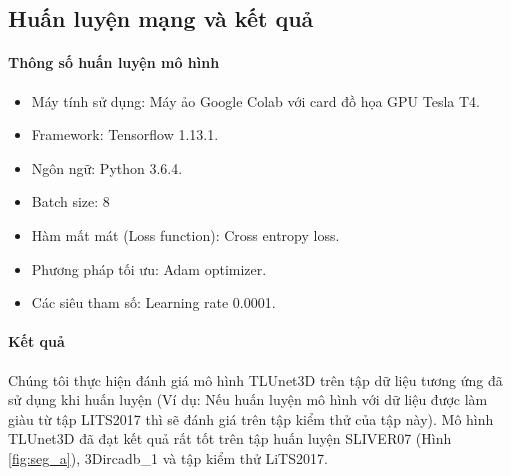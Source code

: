 \subsection{Huấn luyện mạng và kết quả}
\paragraph{Thông số huấn luyện mô hình}
\begin{itemize}
\item Máy tính sử dụng: Máy ảo Google Colab với card đồ họa GPU Tesla T4.
\item Framework: Tensorflow 1.13.1.
\item Ngôn ngữ: Python 3.6.4.
\item Batch size: 8
\item Hàm mất mát (Loss function): Cross entropy loss.
\item Phương pháp tối ưu: Adam optimizer.
\item Các siêu tham số: Learning rate 0.0001.
\end{itemize}
\paragraph{Kết quả}
Chúng tôi thực hiện đánh giá mô hình TLUnet3D trên tập dữ liệu tương ứng đã sử dụng khi huấn luyện (Ví dụ: Nếu huấn luyện mô hình với dữ liệu được làm giàu từ tập LITS2017 thì sẽ đánh giá trên tập kiểm thử của tập này). Mô hình TLUnet3D đã đạt kết quả rất tốt trên tập huấn luyện SLIVER07 (Hình \ref{fig:seg_a}), 3Dircadb\_1 và tập kiểm thử LiTS2017.

